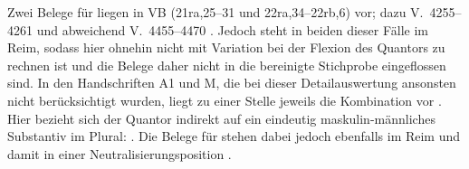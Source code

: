 \begin{exe}
\end{exe}

Zwei Belege für  liegen in VB (21ra,25--31 und
22ra,34--22rb,6) vor; dazu V.~4255--4261 und abweichend V.~4455--4470
\autocite[159, 163]{schroeder1895}. Jedoch steht  in beiden dieser
Fälle im Reim, sodass hier ohnehin nicht mit Variation bei der
Flexion des Quantors zu rechnen ist und die Belege daher nicht in die
bereinigte Stichprobe eingeflossen sind. In den Handschriften A1 und M, die bei
dieser Detailauswertung ansonsten nicht berücksichtigt wurden, liegt zu einer
Stelle jeweils die Kombination  vor . Hier
bezieht sich der Quantor indirekt auf ein eindeutig maskulin-männliches
Substantiv im Plural:  . Die Belege für 
 stehen dabei jedoch ebenfalls im Reim und damit in
einer Neutralisierungsposition
\autocites[vgl.][662--663]{grimm1870}[89]{askedal1973}.

